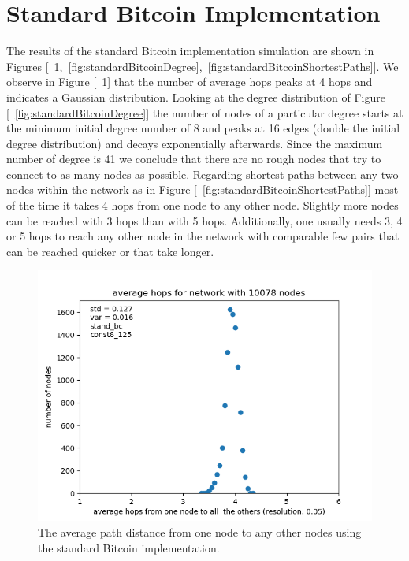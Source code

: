 \documentclass[a4paper, oneside]{discothesis}
\begin{document}
\section{Standard Bitcoin Implementation}

The results of the standard Bitcoin implementation simulation are shown in Figures [~\ref{fig:standardBitcoinAverageHops},~\ref{fig:standardBitcoinDegree},~\ref{fig:standardBitcoinShortestPaths}]. We observe in Figure [~\ref{fig:standardBitcoinAverageHops}] that the number of average hops peaks at 4 hops and indicates a Gaussian distribution. Looking at the degree distribution of Figure [~\ref{fig:standardBitcoinDegree}] the number of nodes of a particular degree starts at the minimum initial degree number of 8 and peaks at 16 edges (double the initial degree distribution) and decays exponentially afterwards. Since the maximum number of degree is 41 we conclude that there are no rough nodes that try to connect to as many nodes as possible.
Regarding shortest paths between any two nodes within the network as in Figure [~\ref{fig:standardBitcoinShortestPaths}] most of the time it takes 4 hops from one node to any other node. Slightly more nodes can be reached with 3 hops than with 5 hops. Additionally, one usually needs 3, 4 or 5 hops to reach any other node in the network with comparable few pairs that can be reached quicker or that take longer.

\begin{figure}
    \centering
    \includegraphics[width=.8\columnwidth]{figures/standard-bitcoin/average-hops-for-network-with-10078-nodes.png}
    \caption{The average path distance from one node to any other nodes using the standard Bitcoin implementation.}
    \label{fig:standardBitcoinAverageHops}
\end{figure}
\end{document}
